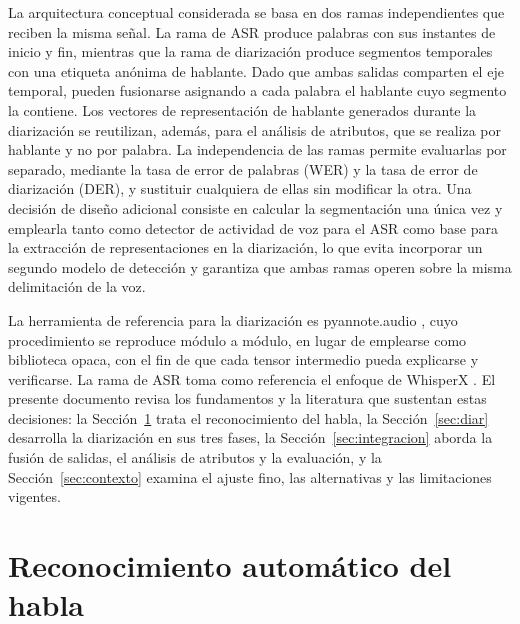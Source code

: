 \documentclass[11pt,a4paper]{article}
\begin{document}
La arquitectura conceptual considerada se basa en dos ramas independientes que reciben la misma señal. La rama de ASR produce palabras con sus instantes de inicio y fin, mientras que la rama de diarización produce segmentos temporales con una etiqueta anónima de hablante. Dado que ambas salidas comparten el eje temporal, pueden fusionarse asignando a cada palabra el hablante cuyo segmento la contiene. Los vectores de representación de hablante generados durante la diarización se reutilizan, además, para el análisis de atributos, que se realiza por hablante y no por palabra. La independencia de las ramas permite evaluarlas por separado, mediante la tasa de error de palabras (WER) y la tasa de error de diarización (DER), y sustituir cualquiera de ellas sin modificar la otra. Una decisión de diseño adicional consiste en calcular la segmentación una única vez y emplearla tanto como detector de actividad de voz para el ASR como base para la extracción de representaciones en la diarización, lo que evita incorporar un segundo modelo de detección y garantiza que ambas ramas operen sobre la misma delimitación de la voz.

La herramienta de referencia para la diarización es pyannote.audio \cite{bredin2020}, cuyo procedimiento se reproduce módulo a módulo, en lugar de emplearse como biblioteca opaca, con el fin de que cada tensor intermedio pueda explicarse y verificarse. La rama de ASR toma como referencia el enfoque de WhisperX \cite{bain2023}. El presente documento revisa los fundamentos y la literatura que sustentan estas decisiones: la Sección~\ref{sec:asr} trata el reconocimiento del habla, la Sección~\ref{sec:diar} desarrolla la diarización en sus tres fases, la Sección~\ref{sec:integracion} aborda la fusión de salidas, el análisis de atributos y la evaluación, y la Sección~\ref{sec:contexto} examina el ajuste fino, las alternativas y las limitaciones vigentes.

\section{Reconocimiento automático del habla}
\label{sec:asr}
\end{document}
